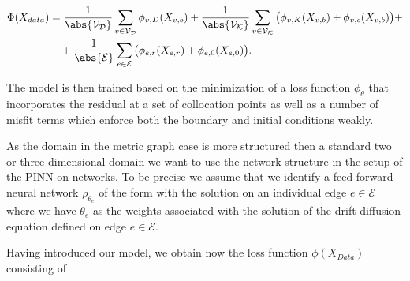 \begin{align*} \label{eq:loss}
    \Phi(X_{data}) & =  \frac{1}{\abs{\mathcal{V}_\mathcal{D}}} \sum_{v \in \mathcal{V}_\mathcal{D}} \phi_{v,D}(X_{v,b}) + \frac{1}{\abs{\mathcal{V}_\mathcal{K}}} \sum_{v \in \mathcal{V}_\mathcal{K}} \big( \phi_{v,K} (X_{v,b}) + \phi_{v,c}(X_{v,b}) \big) + \\
    & \quad + \frac{1}{\abs{\mathcal{E}}} \sum_{e \in \mathcal{E}} \big( \phi_{e,r} (X_{e,r}) + \phi_{e,0} (X_{e,0}) \big). 
\end{align*}



The model is then trained based on the minimization of a loss function $\phi_\theta$ that incorporates the residual at a set of collocation points as well as a number of misfit terms which enforce both the boundary and initial conditions weakly.

As the domain in the metric graph case is more structured then a standard two or three-dimensional domain we want to use the network structure in the setup of the PINN on networks.
To be precise we assume that we identify a feed-forward neural network $\rho_{\theta_e}$ of the form  with the solution on an individual edge $e \in \mathcal{E}$ where we have $\theta_e$ as the weights associated with the solution of the drift-diffusion equation defined on edge $e \in \mathcal{E}$.

Having introduced our model, we obtain now the loss function $\phi(X_{Data})$ consisting of

